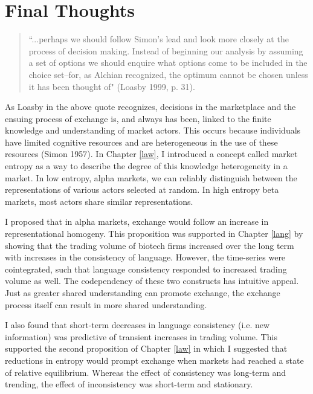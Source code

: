 \chapter{Final Thoughts \label{final}}


\begin{small}
\begin{quote}
``...perhaps we should follow Simon's lead and look more closely at the process of decision making. Instead of beginning our analysis by assuming a set of options we should enquire what options come to be included in the choice set--for, as Alchian recognized, the optimum cannot be chosen unless it has been thought of" (Loasby 1999, p. 31). 
\end{quote}
\end{small}

As Loasby in the above quote recognizes, decisions in the marketplace and the ensuing process of exchange is, and always has been, linked to the finite knowledge and understanding of market actors. This occurs because individuals have limited cognitive resources and are heterogeneous in the use of these resources (Simon 1957). In Chapter \ref{law}, I introduced a concept called market entropy as a way to describe the degree of this knowledge heterogeneity in a market. In low entropy, alpha markets, we can reliably distinguish between the representations of various actors selected at random. In high entropy beta markets, most actors share similar representations.

I proposed that in alpha markets, exchange would follow an increase in representational homogeny. This proposition was supported in Chapter \ref{lang} by showing that the trading volume of biotech firms increased over the long term with increases in the consistency of language. However, the time-series were cointegrated, such that language consistency responded to increased trading volume as well. The codependency of these two constructs has intuitive appeal.  Just as greater shared understanding can promote exchange, the exchange process itself can result in more shared understanding.

I also found that short-term decreases in language consistency (i.e. new information) was predictive of transient increases in trading volume. This supported the second proposition of Chapter \ref{law} in which I suggested that reductions in entropy would prompt exchange when markets had reached a state of relative equilibrium. Whereas the effect of consistency was long-term and trending, the effect of inconsistency was short-term and stationary.

